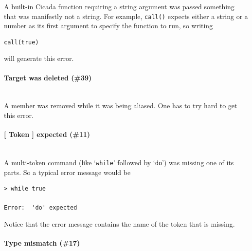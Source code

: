 \documentclass{article}
\newenvironment{code}{
       \begin{list}{}{
               \setlength{\leftmargin}{.4in}
               \setlength{\rightmargin}{0in}
               \setlength{\topsep}{.2in}
       }
       \small
       \item[] }
       { \end{list}   }
\begin{document}
A built-in Cicada function requiring a string argument was passed something that was manifestly not a string.  For example, \verb#call()# expects either a string or a number as its first argument to specify the function to run, so writing

\begin{code} \begin{verbatim}
call(true)
\end{verbatim} \end{code}

\noindent will generate this error.\\




\paragraph{Target was deleted (\#39)\\\\}

A member was removed while it was being aliased.  One has to try hard to get this error.\\




\paragraph{[ Token ] expected (\#11)\\\\}

A multi-token command (like `\verb#while#' followed by `\verb#do#') was missing one of its parts.  So a typical error message would be

\begin{code} \begin{verbatim}
> while true

Error:  'do' expected
\end{verbatim} \end{code}

\noindent Notice that the error message contains the name of the token that is missing.\\





\paragraph{Type mismatch (\#17)\\\\}
\end{document}
